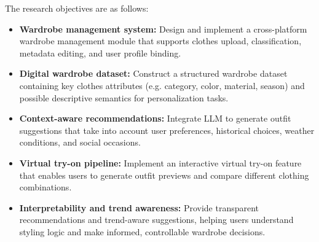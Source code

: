 The research objectives are as follows:
\begin{itemize}
    \item \textbf{Wardrobe management system:} Design and implement a cross-platform wardrobe management module that supports clothes upload, classification, metadata editing, and user profile binding.
    \item \textbf{Digital wardrobe dataset:} Construct a structured wardrobe dataset containing key clothes attributes (e.g. category, color, material, season) and possible descriptive semantics for personalization tasks.
    \item \textbf{Context-aware recommendations:} Integrate LLM to generate outfit suggestions that take into account user preferences, historical choices, weather conditions, and social occasions.
    \item \textbf{Virtual try-on pipeline:} Implement an interactive virtual try-on feature that enables users to generate outfit previews and compare different clothing combinations.
    \item \textbf{Interpretability and trend awareness:} Provide transparent recommendations and trend-aware suggestions, helping users understand styling logic and make informed, controllable wardrobe decisions.
\end{itemize}